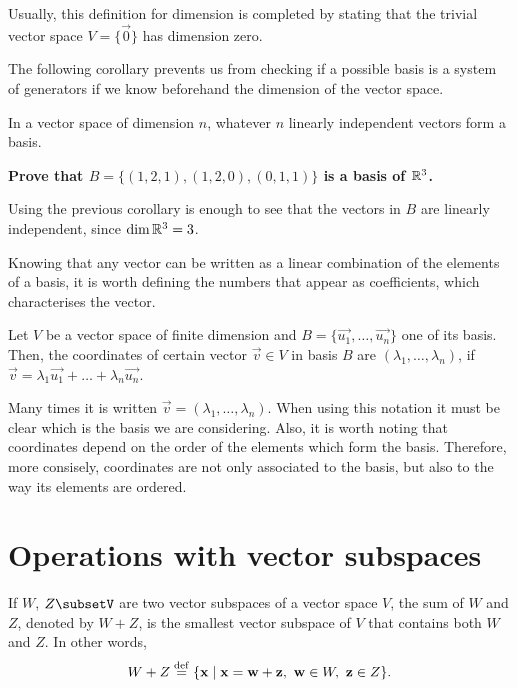 \begin{note}
    Usually, this definition for dimension is completed by stating that the trivial vector space $V = \{\vec{0}\} $ has dimension zero.
\end{note}

The following corollary prevents us from checking if a possible basis is a system of generators if we know
beforehand the dimension of the vector space.

\begin{coro}
    In a vector space of dimension $n$, whatever $n$ linearly independent vectors form a basis.
\end{coro}

\begin{example}
    \textbf{Prove that $B = \{\left( 1, 2, 1 \right) , \left( 1, 2, 0 \right), \left( 0, 1, 1 \right)\} $ is
    a basis of $\mathbb{R}^3$.}

    Using the previous corollary is enough to see that the vectors in $B$ are linearly independent, since
    $\dim \mathbb{R}^3 = 3$.
\end{example}

Knowing that any vector can be written as a linear combination of the elements of a basis, it is worth
defining the numbers that appear as coefficients, which characterises the vector.

\begin{defi}[Coordinates]
    Let $V$ be a vector space of finite dimension and $B = \{\vec{u_1}, \ldots, \vec{u_n}\} $ one of its
    basis. Then, the coordinates of certain vector $\vec{v}\in V$ in basis $B$ are $\left( \lambda_1, \ldots,
    \lambda_n\right) $, if $\vec{v} = \lambda_1\vec{u_1} + \ldots + \lambda_n\vec{u_n}$.
\end{defi}

\begin{note}
    Many times it is written $\vec{v} = \left( \lambda_1, \ldots, \lambda_n \right) $. When using this
    notation it must be clear which is the basis we are considering. Also, it is worth noting that coordinates
    depend on the order of the elements which form the basis. Therefore, more consisely, coordinates are not
    only associated to the basis, but also to the way its elements are ordered.
\end{note}

\section{Operations with vector subspaces}
\begin{prop}
    If $W$, $Z\subsetV$ are two vector subspaces of a vector space $V$, the sum of $W$ and $Z$, denoted by
    $W + Z$, is the smallest vector subspace of $V$ that contains both $W$ and $Z$. In other words,
    \begin{equation}
        W + Z \overset{\mathrm{def}}{=} \{\mathbf{x}\; | \; \mathbf{x} = \mathbf{w} + \mathbf{z},\ \mathbf{w}\in W,\ \mathbf{z}\in Z\}.
    \end{equation}
\end{prop}

